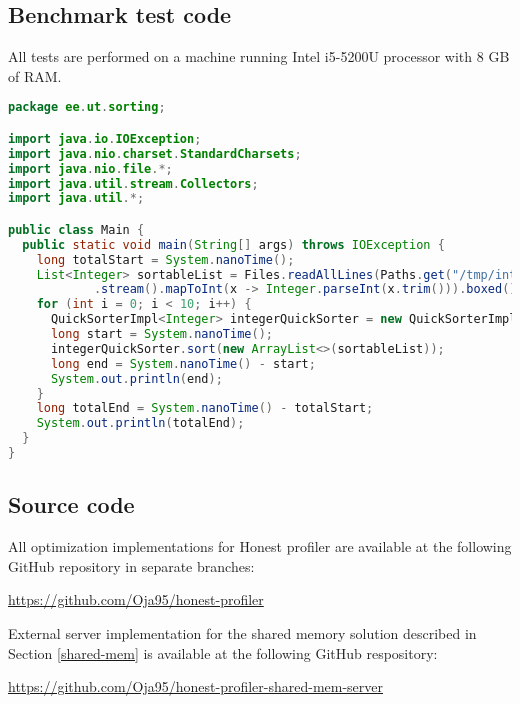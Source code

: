 \documentclass[..thesis.tex]{subfiles}
\begin{document}
\subsection{Benchmark test code}
\label{A:benchmark-test-code}
All tests are performed on a machine running Intel i5-5200U processor with 8 GB of RAM.

\begin{lstlisting}[language=Java,style=def]
package ee.ut.sorting;

import java.io.IOException;
import java.nio.charset.StandardCharsets;
import java.nio.file.*;
import java.util.stream.Collectors;
import java.util.*;

public class Main {
  public static void main(String[] args) throws IOException {
    long totalStart = System.nanoTime();
    List<Integer> sortableList = Files.readAllLines(Paths.get("/tmp/integers.data"), StandardCharsets.UTF_8)
            .stream().mapToInt(x -> Integer.parseInt(x.trim())).boxed().collect(Collectors.toList());
    for (int i = 0; i < 10; i++) {
      QuickSorterImpl<Integer> integerQuickSorter = new QuickSorterImpl<>();
      long start = System.nanoTime();
      integerQuickSorter.sort(new ArrayList<>(sortableList));
      long end = System.nanoTime() - start;
      System.out.println(end);
    }
    long totalEnd = System.nanoTime() - totalStart;
    System.out.println(totalEnd);
  }
}

\end{lstlisting}

\subsection{Source code}
\label{B:source-code}
All optimization implementations for Honest profiler are available at the following GitHub repository in separate branches:

\url{https://github.com/Oja95/honest-profiler}

External server implementation for the shared memory solution described in Section \ref{shared-mem} is available at the following GitHub respository:

\url{https://github.com/Oja95/honest-profiler-shared-mem-server}



\newpage
\end{document}
